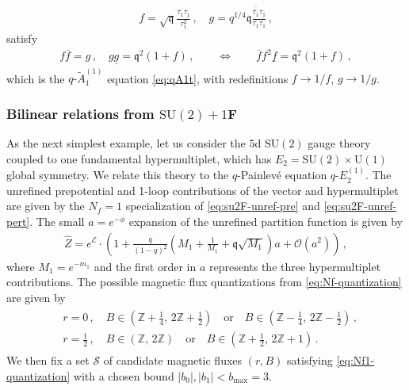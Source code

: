 \documentclass[11pt, a4paper]{article}
\theoremstyle{definition}
\begin{document}
\begin{align}
    f = \sqrt{\mathfrak{q}} \frac{\overline{\tau_1} \underline{\tau_1}}{\tau_1^2} \, , \quad
    g = q^{1/4} \mathfrak{q} \frac{\overline{\overline{\tau_1}} \underline{\tau_1}}{\overline{\tau_1} \tau_1} \, ,
\end{align}
satisfy
\begin{align}
    f\overline{f} = g \, , \quad
    g\underline{g} = \mathfrak{q}^2 (1+f) \, ,
    \qquad \Leftrightarrow \qquad
    \overline{f}f^2\underline{f} = \mathfrak{q}^2 (1+f) \, ,
\end{align}
which is the $ q\text{-}\tilde{A}_1^{(1)} $ equation \eqref{eq:qA1t}, with redefinitions $ f\to 1/f $, $ g\to 1/g $.



\subsubsection{Bilinear relations from \texorpdfstring{$ \mathrm{SU}(2)+1\mathbf{F} $}{SU(2)+1F}}

As the next simplest example, let us consider the 5d $ \mathrm{SU}(2) $ gauge theory coupled to one fundamental hypermultiplet, which has $ E_2 = \mathrm{SU}(2) \times \mathrm{U}(1) $ global symmetry. We relate this theory to the $ q $-Painlev\'e equation $ q\text{-}E_2^{(1)} $. The unrefined prepotential and 1-loop contributions of the vector and hypermultiplet are given by the $ N_f=1 $ specialization of \eqref{eq:su2F-unref-pre} and \eqref{eq:su2F-unref-pert}. The small $ a=e^{-\phi} $ expansion of the unrefined partition function is given by
\begin{align}\label{eq:Nf1-invarZ}
    \hat{Z} = e^{\mathcal{E}} \cdot \left( 1 + \frac{q}{(1-q)^2} \left( M_1 + \frac{1}{M_1} + \mathfrak{q} \sqrt{M_1} \right) a + \mathcal{O}(a^2) \right) \, ,
\end{align}
where $ M_1=e^{-m_1} $ and the first order in $ a $ represents the three hypermultiplet contributions. The possible magnetic flux quantizations from \eqref{eq:Nf-quantization} are given by
\begin{align}
    \begin{aligned}\label{eq:Nf1-quantization}
        & r = 0 \, , \quad
        B \in \left( \mathbb{Z} + \frac{1}{4}, \, 2\mathbb{Z} + \frac{1}{2} \right) \quad \text{or} \quad
        B \in \left( \mathbb{Z} - \frac{1}{4}, \, 2\mathbb{Z} - \frac{1}{2} \right) \, , \\
        & r = \frac{1}{2} \, , \quad
        B \in \left( \mathbb{Z}, \, 2\mathbb{Z} \right) \quad \text{or} \quad
        B \in \left( \mathbb{Z} + \frac{1}{2}, \, 2\mathbb{Z} + 1 \right) \, .
    \end{aligned}
\end{align}
We then fix a set $ \mathcal{S} $ of candidate magnetic fluxes $ (r,B) $ satisfying \eqref{eq:Nf1-quantization} with a chosen bound $ |b_0|, |b_1| < b_{\mathrm{max}} = 3 $.
\end{document}
